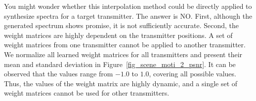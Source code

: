 You might wonder whether this interpolation method could be directly applied to synthesize spectra for a target transmitter.
The answer is NO.
First, although the generated spectrum shows promise, it is not sufficiently accurate.
Second, the weight matrices are highly dependent on the transmitter positions.
A set of weight matrices from one transmitter cannot be applied to another transmitter.
We normalize all learned weight matrices for all transmitters and present their mean and standard deviation in Figure~\ref{fig_scene_moti_2_psnr}.
It can be observed that the values range from $-1.0$ to $1.0$, covering all possible values.
Thus, the values of the weight matrix are highly dynamic, and a single set of weight matrices cannot be used for other transmitters.


